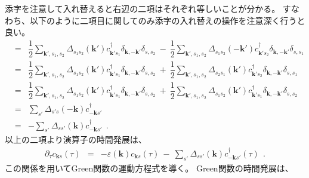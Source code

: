 \documentclass[a4j]{jsarticle}
\begin{document}
%
%
%
%
添字を注意して入れ替えると右辺の二項はそれぞれ等しいことが分かる。
すなわち、以下のように二項目に関してのみ添字の入れ替えの操作を注意深く行うと良い。
%
%
%
%
\begin{eqnarray}
	[ \mathcal{H}_{\rm BCS} \ , \ c_{\bm{k}s} ]
	&=&
	\dfrac{1}{2}
	\sum_{\bm{k}',s_{1},s_{2}}
	\Delta_{ s_{1} s_{2} }( \bm{k}' )
	c_{\bm{k}' s_{1}}^{\dagger}
	\delta_{\bm{k},-\bm{k}'}
	\delta_{s,s_{2}}
	\ - \
	\dfrac{1}{2}
	\sum_{\bm{k}',s_{1},s_{2}}
	\Delta_{ s_{1} s_{2} }( - \bm{k}' )
	c_{\bm{k}' s_{2}}^{\dagger}
	\delta_{\bm{k},-\bm{k}'}
	\delta_{s,s_{1}}
	\nonumber \\[2mm] &=&
	\dfrac{1}{2}
	\sum_{\bm{k}',s_{1},s_{2}}
	\Delta_{ s_{1} s_{2} }( \bm{k}' )
	c_{\bm{k}' s_{1}}^{\dagger}
	\delta_{\bm{k},-\bm{k}'}
	\delta_{s,s_{2}}
	\ + \
	\dfrac{1}{2}
	\sum_{\bm{k}',s_{1},s_{2}}
	\Delta_{ s_{2} s_{1} }( \bm{k}' )
	c_{\bm{k}' s_{2}}^{\dagger}
	\delta_{\bm{k},-\bm{k}'}
	\delta_{s,s_{1}}
	\nonumber \\[2mm] &=&
	\dfrac{1}{2}
	\sum_{\bm{k}',s_{1},s_{2}}
	\Delta_{ s_{1} s_{2} }( \bm{k}' )
	c_{\bm{k}' s_{1}}^{\dagger}
	\delta_{\bm{k},-\bm{k}'}
	\delta_{s,s_{2}}
	\ + \
	\dfrac{1}{2}
	\sum_{\bm{k}',s_{1},s_{2}}
	\Delta_{ s_{1} s_{2} }( \bm{k}' )
	c_{\bm{k}' s_{1}}^{\dagger}
	\delta_{\bm{k},-\bm{k}'}
	\delta_{s,s_{2}}
	\nonumber \\[2mm] &=&
	\sum_{ s' }
	\Delta_{ s' s }( - \bm{k} )
	c_{ - \bm{k} s'}^{\dagger}
	\nonumber \\[2mm] &=&
	-
	\sum_{ s' }
	\Delta_{ s s' }( \bm{k} )
	c_{ - \bm{k} s'}^{\dagger}
	\ \ .
\end{eqnarray}
%
%
%
%
以上の二項より演算子の時間発展は、
%
%
%
%
\begin{eqnarray}
	\partial_{\tau}
	c_{\bm{k}s} (\tau)
	&=&
	-
	\varepsilon( \bm{k} )
	c_{\bm{k} s} (\tau)
	\ - \
	\sum_{ s' }
	\Delta_{ s s' }( \bm{k} )
	c_{ - \bm{k} s'}^{\dagger} ( \tau )
	\ \ .
	\label{eqn:enzansihattenntime}
\end{eqnarray}
%
%
%
%
この関係を用いてGreen関数の運動方程式を導く。
Green関数の時間発展は、
%
%
%
%
\end{document}
